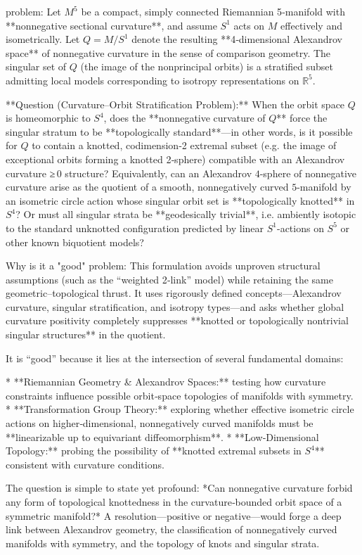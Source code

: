 problem:  
Let \( M^5 \) be a compact, simply connected Riemannian 5‑manifold with **nonnegative sectional curvature**, and assume \( S^1 \) acts on \( M \) effectively and isometrically.  Let \( Q = M / S^1 \) denote the resulting **4‑dimensional Alexandrov space** of nonnegative curvature in the sense of comparison geometry.  The singular set of \( Q \) (the image of the nonprincipal orbits) is a stratified subset admitting local models corresponding to isotropy representations on \( \mathbb{R}^5 \).  

**Question (Curvature–Orbit Stratification Problem):**  
When the orbit space \( Q \) is homeomorphic to \( S^4 \), does the **nonnegative curvature of \( Q \)** force the singular stratum to be **topologically standard**—in other words, is it possible for \( Q \) to contain a knotted, codimension‑2 extremal subset (e.g. the image of exceptional orbits forming a knotted 2‑sphere) compatible with an Alexandrov curvature ≥ 0 structure?  
Equivalently, can an Alexandrov \(4\)-sphere of nonnegative curvature arise as the quotient of a smooth, nonnegatively curved \(5\)-manifold by an isometric circle action whose singular orbit set is **topologically knotted** in \( S^4 \)?  Or must all singular strata be **geodesically trivial**, i.e. ambiently isotopic to the standard unknotted configuration predicted by linear \( S^1 \)-actions on \( S^5 \) or other known biquotient models?

Why is it a "good" problem:  
This formulation avoids unproven structural assumptions (such as the “weighted 2‑link” model) while retaining the same geometric–topological thrust.  It uses rigorously defined concepts—Alexandrov curvature, singular stratification, and isotropy types—and asks whether global curvature positivity completely suppresses **knotted or topologically nontrivial singular structures** in the quotient.

It is “good” because it lies at the intersection of several fundamental domains:

* **Riemannian Geometry & Alexandrov Spaces:** testing how curvature constraints influence possible orbit‑space topologies of manifolds with symmetry.
* **Transformation Group Theory:** exploring whether effective isometric circle actions on higher‑dimensional, nonnegatively curved manifolds must be **linearizable up to equivariant diffeomorphism**.
* **Low‑Dimensional Topology:** probing the possibility of **knotted extremal subsets in \( S^4 \)** consistent with curvature conditions.

The question is simple to state yet profound: *Can nonnegative curvature forbid any form of topological knottedness in the curvature‑bounded orbit space of a symmetric manifold?*  
A resolution—positive or negative—would forge a deep link between Alexandrov geometry, the classification of nonnegatively curved manifolds with symmetry, and the topology of knots and singular strata.